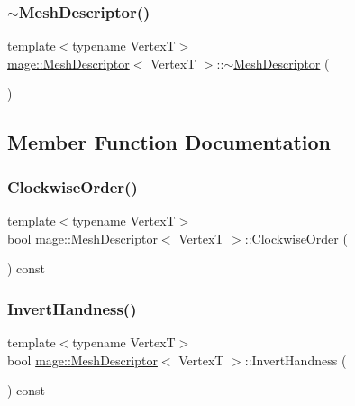 \subsubsection{\texorpdfstring{$\sim$\+Mesh\+Descriptor()}{~MeshDescriptor()}}
{\footnotesize\ttfamily template$<$typename VertexT$>$ \\
\hyperlink{structmage_1_1_mesh_descriptor}{mage\+::\+Mesh\+Descriptor}$<$ VertexT $>$\+::$\sim$\hyperlink{structmage_1_1_mesh_descriptor}{Mesh\+Descriptor} (\begin{DoxyParamCaption}{ }\end{DoxyParamCaption})\hspace{0.3cm}{\ttfamily [default]}}



\subsection{Member Function Documentation}
\hypertarget{structmage_1_1_mesh_descriptor_ab81b000d93242ae002227010c4a9446c}{}\label{structmage_1_1_mesh_descriptor_ab81b000d93242ae002227010c4a9446c} 
\subsubsection{\texorpdfstring{Clockwise\+Order()}{ClockwiseOrder()}}
{\footnotesize\ttfamily template$<$typename VertexT$>$ \\
bool \hyperlink{structmage_1_1_mesh_descriptor}{mage\+::\+Mesh\+Descriptor}$<$ VertexT $>$\+::Clockwise\+Order (\begin{DoxyParamCaption}{ }\end{DoxyParamCaption}) const}

\hypertarget{structmage_1_1_mesh_descriptor_a7f63b926282683dcb0f674eca0901f5e}{}\label{structmage_1_1_mesh_descriptor_a7f63b926282683dcb0f674eca0901f5e} 
\subsubsection{\texorpdfstring{Invert\+Handness()}{InvertHandness()}}
{\footnotesize\ttfamily template$<$typename VertexT$>$ \\
bool \hyperlink{structmage_1_1_mesh_descriptor}{mage\+::\+Mesh\+Descriptor}$<$ VertexT $>$\+::Invert\+Handness (\begin{DoxyParamCaption}{ }\end{DoxyParamCaption}) const}

